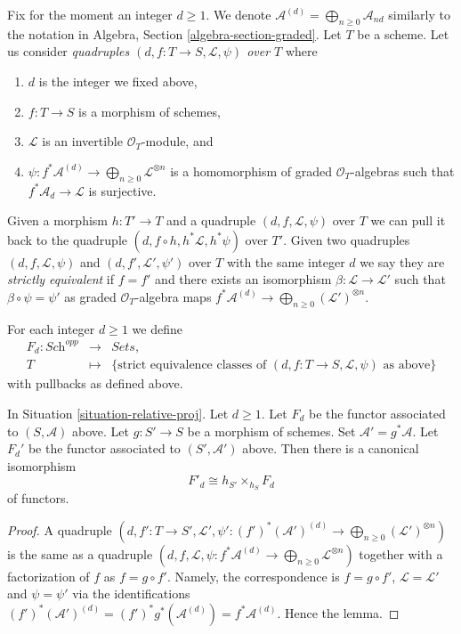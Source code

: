 \medskip\noindent
Fix for the moment an integer $d \geq 1$.
We denote $\mathcal{A}^{(d)} = \bigoplus_{n \geq 0} \mathcal{A}_{nd}$
similarly to the notation in Algebra, Section \ref{algebra-section-graded}.
Let $T$ be a scheme.
Let us consider {\it quadruples $(d, f : T \to S, \mathcal{L}, \psi)$
over $T$} where
\begin{enumerate}
\item $d$ is the integer we fixed above,
\item $f : T \to S$ is a morphism of schemes,
\item $\mathcal{L}$ is an invertible $\mathcal{O}_T$-module, and
\item
$\psi : f^*\mathcal{A}^{(d)} \to \bigoplus_{n \geq 0}\mathcal{L}^{\otimes n}$
is a homomorphism of graded $\mathcal{O}_T$-algebras
such that $f^*\mathcal{A}_d \to \mathcal{L}$ is surjective.
\end{enumerate}
Given a morphism $h : T' \to T$ and a quadruple
$(d, f, \mathcal{L}, \psi)$ over $T$ we can pull it back to the
quadruple $(d, f \circ h, h^*\mathcal{L}, h^*\psi)$ over $T'$.
Given two quadruples $(d, f, \mathcal{L}, \psi)$ and
$(d, f', \mathcal{L}', \psi')$ over $T$ with the same integer $d$
we say they are {\it strictly equivalent} if $f = f'$ and there exists
an isomorphism $\beta : \mathcal{L} \to \mathcal{L}'$
such that $\beta \circ \psi = \psi'$ as graded $\mathcal{O}_T$-algebra maps
$f^*\mathcal{A}^{(d)} \to \bigoplus_{n \geq 0} (\mathcal{L}')^{\otimes n}$.

\medskip\noindent
For each integer $d \geq 1$ we define
\begin{eqnarray*}
F_d : \textit{Sch}^{opp} & \longrightarrow & \textit{Sets}, \\
T & \longmapsto &
\{\text{strict equivalence classes of }
(d, f : T \to S, \mathcal{L}, \psi)
\text{ as above}\}
\end{eqnarray*}
with pullbacks as defined above.

\begin{lemma}
\label{lemma-proj-base-change}
In Situation \ref{situation-relative-proj}. Let $d \geq 1$.
Let $F_d$ be the functor
associated to $(S, \mathcal{A})$ above.
Let $g : S' \to S$ be a morphism of schemes.
Set $\mathcal{A}' = g^*\mathcal{A}$. Let $F_d'$ be the
functor associated to $(S', \mathcal{A}')$ above.
Then there is a canonical isomorphism
$$
F'_d \cong h_{S'} \times_{h_S} F_d
$$
of functors.
\end{lemma}

\begin{proof}
A quadruple
$(d, f' : T \to S', \mathcal{L}',
\psi' : (f')^*(\mathcal{A}')^{(d)} \to
\bigoplus_{n \geq 0} (\mathcal{L}')^{\otimes n})$
is the same as a quadruple
$(d, f, \mathcal{L},
\psi : f^*\mathcal{A}^{(d)} \to
\bigoplus_{n \geq 0} \mathcal{L}^{\otimes n})$
together with a factorization of $f$ as $f = g \circ f'$. Namely,
the correspondence is $f = g \circ f'$, $\mathcal{L} = \mathcal{L}'$
and $\psi = \psi'$ via the identifications
$(f')^*(\mathcal{A}')^{(d)} = (f')^*g^*(\mathcal{A}^{(d)}) =
f^*\mathcal{A}^{(d)}$. Hence the lemma.
\end{proof}


